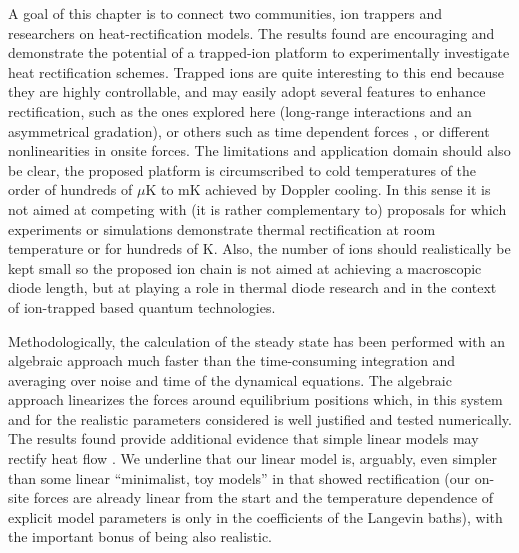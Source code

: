 A goal of this chapter is to connect two communities, ion trappers and
researchers on heat-rectification models. The results found are encouraging and demonstrate the potential of a trapped-ion platform to experimentally investigate heat rectification schemes. Trapped ions are quite interesting to this end because  they are highly controllable,  and may easily adopt several features to enhance rectification, such as
the ones explored here (long-range interactions and an asymmetrical gradation),
or others such as time dependent forces \cite{Li2012,Riera-Campeny2018}, or different nonlinearities in onsite forces.
The limitations and application domain should also be clear,  the proposed platform is circumscribed to cold temperatures of the order of hundreds of $\mu$K to mK achieved by Doppler cooling.
In this sense it is not aimed at competing  with (it is rather complementary to)
proposals for which experiments  \cite{Chang2006,Leitner2013,Kobayashi2009,Elzouka2017} or simulations \cite{Zhang2015,Ma2018,Reid2019}
demonstrate thermal rectification
at room temperature or for hundreds of K.
Also, the number of ions should realistically be kept small so the proposed ion chain
is not aimed at achieving a macroscopic diode length, but at playing a role in thermal diode research
and in the context of ion-trapped based quantum technologies.

Methodologically, the calculation of the steady state has been performed with an algebraic approach much faster than
the time-consuming integration and averaging over noise and time of the dynamical equations.
The algebraic approach linearizes the forces around equilibrium positions which, in this system and for the realistic parameters considered  is well justified and tested numerically.
The results found provide additional evidence that simple linear models may  rectify heat flow \cite{Pereira2017}.  We  underline that our linear
model is, arguably,  even simpler than some linear ``minimalist, toy models'' in \cite{Pereira2017} that showed rectification (our on-site forces are already linear from the start and the temperature dependence of explicit model parameters is only in the coefficients of the Langevin baths), with the important bonus of being also realistic.
